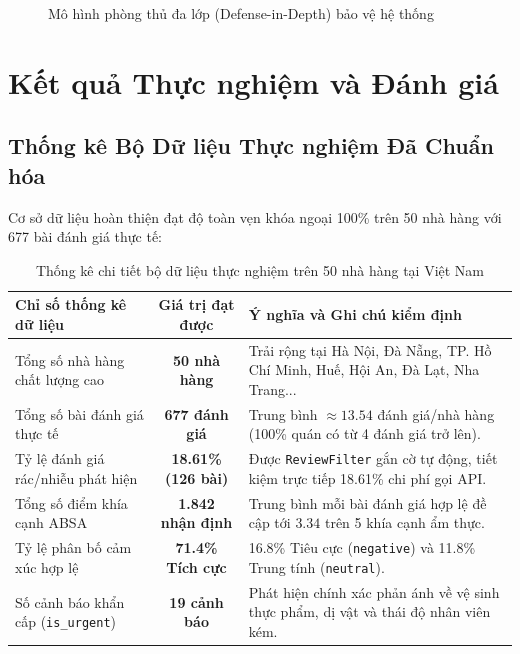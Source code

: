 \documentclass[12pt, a4paper, oneside]{book}
\begin{document}
\begin{figure}[H]
{%
}
\caption{Mô hình phòng thủ đa lớp (Defense-in-Depth) bảo vệ hệ thống}
\label{fig:security_topology}
\end{figure}

\chapter{Kết quả Thực nghiệm và Đánh giá}

\section{Thống kê Bộ Dữ liệu Thực nghiệm Đã Chuẩn hóa}
Cơ sở dữ liệu hoàn thiện đạt độ toàn vẹn khóa ngoại 100\% trên 50 nhà hàng với 677 bài đánh giá thực tế:

\begin{table}[H]
\centering
\caption{Thống kê chi tiết bộ dữ liệu thực nghiệm trên 50 nhà hàng tại Việt Nam}
\label{tab:dataset_stats}
\vspace{0.15cm}
\footnotesize
\begin{tabularx}{\textwidth}{l c X}
\toprule
\rowcolor{blue!8}
\textbf{Chỉ số thống kê dữ liệu} & \textbf{Giá trị đạt được} & \textbf{Ý nghĩa và Ghi chú kiểm định} \\
\midrule
Tổng số nhà hàng chất lượng cao & \textbf{50 nhà hàng} & Trải rộng tại Hà Nội, Đà Nẵng, TP. Hồ Chí Minh, Huế, Hội An, Đà Lạt, Nha Trang... \\
Tổng số bài đánh giá thực tế & \textbf{677 đánh giá} & Trung bình $\approx 13.54$ đánh giá/nhà hàng (100\% quán có từ 4 đánh giá trở lên). \\
Tỷ lệ đánh giá rác/nhiễu phát hiện & \textbf{18.61\% (126 bài)} & Được \texttt{ReviewFilter} gắn cờ tự động, tiết kiệm trực tiếp 18.61\% chi phí gọi API. \\
Tổng số điểm khía cạnh ABSA & \textbf{1.842 nhận định} & Trung bình mỗi bài đánh giá hợp lệ đề cập tới $3.34$ trên 5 khía cạnh ẩm thực. \\
Tỷ lệ phân bố cảm xúc hợp lệ & \textbf{71.4\% Tích cực} & 16.8\% Tiêu cực (\texttt{negative}) và 11.8\% Trung tính (\texttt{neutral}). \\
Số cảnh báo khẩn cấp (\texttt{is\_urgent}) & \textbf{19 cảnh báo} & Phát hiện chính xác phản ánh về vệ sinh thực phẩm, dị vật và thái độ nhân viên kém. \\
\bottomrule
\end{tabularx}
\end{table}
\end{document}
